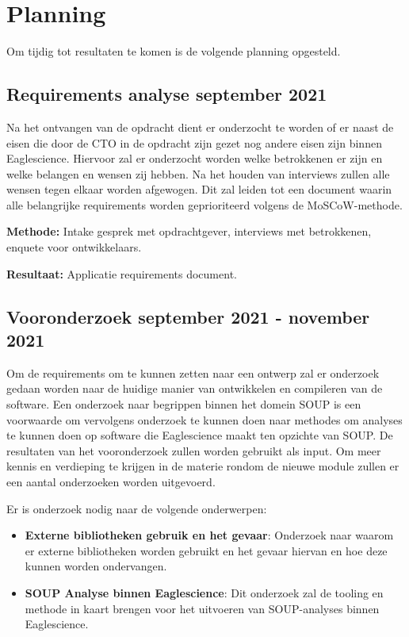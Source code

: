 \section{Planning}\label{sec:planning}
Om tijdig tot resultaten te komen is de volgende planning opgesteld.

\subsection{Requirements analyse \textbf{september 2021}}\label{subsec:requirements-analyse}
Na het ontvangen van de opdracht dient er onderzocht te worden of er naast de eisen die door de CTO in de opdracht zijn gezet nog andere eisen zijn binnen Eaglescience. Hiervoor zal er onderzocht worden welke betrokkenen er zijn en welke belangen en wensen zij hebben. Na het houden van interviews zullen alle wensen tegen elkaar worden afgewogen. Dit zal leiden tot een document waarin alle belangrijke requirements worden geprioriteerd volgens de MoSCoW-methode.

\textbf{Methode:} Intake gesprek met opdrachtgever, interviews met betrokkenen, enquete voor ontwikkelaars.

\textbf{Resultaat:} Applicatie requirements document.

\subsection{Vooronderzoek \textbf{september 2021 - november 2021 }}\label{subsec:onderzoek}
Om de requirements om te kunnen zetten naar een ontwerp zal er onderzoek gedaan worden naar de huidige manier van ontwikkelen en compileren van de software. Een onderzoek naar begrippen binnen het domein SOUP is een voorwaarde om vervolgens onderzoek te kunnen doen naar methodes om analyses te kunnen doen op software die Eaglescience maakt ten opzichte van SOUP. De resultaten van het vooronderzoek zullen worden gebruikt als input.
Om meer kennis en verdieping te krijgen in de materie rondom de nieuwe module zullen er een aantal onderzoeken worden uitgevoerd.


Er is onderzoek nodig naar de volgende onderwerpen:
\begin{itemize}
    \item \textbf{Externe bibliotheken gebruik en het gevaar}: Onderzoek naar waarom er externe bibliotheken worden gebruikt en het gevaar hiervan en hoe deze kunnen worden ondervangen.
    \item \textbf{SOUP Analyse binnen Eaglescience}: Dit onderzoek zal de tooling en methode in kaart brengen voor het uitvoeren van SOUP-analyses binnen Eaglescience.
\end{itemize}

